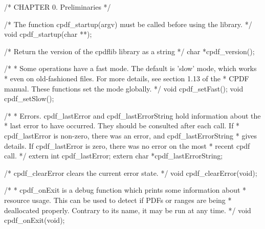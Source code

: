 /* CHAPTER 0. Preliminaries */

/* The function cpdf_startup(argv) must be called before using the library.  */
void cpdf_startup(char **);

/* Return the version of the cpdflib library as a string */
char *cpdf_version();

/*
 * Some operations have a fast mode. The default is 'slow' mode, which works
 * even on old-fashioned files. For more details, see section 1.13 of the
 * CPDF manual. These functions set the mode globally.
 */
void cpdf_setFast();
void cpdf_setSlow();

/*
 * Errors. cpdf_lastError and cpdf_lastErrorString hold information about the
 * last error to have occurred. They should be consulted after each call. If
 * cpdf_lastError is non-zero, there was an error, and cpdf_lastErrorString
 * gives details. If cpdf_lastError is zero, there was no error on the most
 * recent cpdf call.
 */
extern int cpdf_lastError;
extern char *cpdf_lastErrorString;

/* cpdf_clearError clears the current error state. */
void cpdf_clearError(void);

/*
 * cpdf_onExit is a debug function which prints some information about
 * resource usage. This can be used to detect if PDFs or ranges are being
 * deallocated properly. Contrary to its name, it may be run at any time.
 */
void cpdf_onExit(void);

